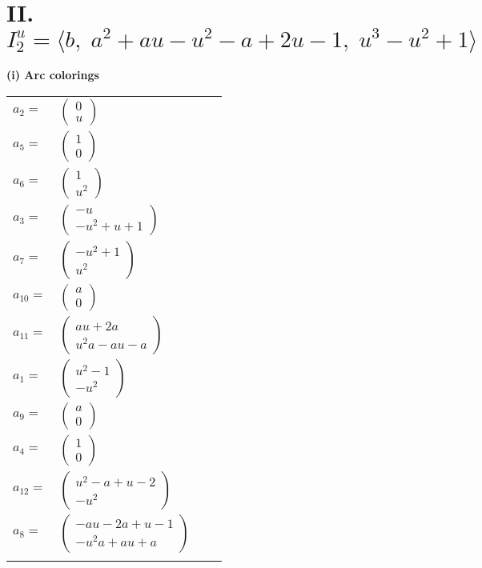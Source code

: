 \documentclass[1p]{elsarticle_modified}
\theoremstyle{definition}
\begin{document}
\centering \section*{II. $I^u_{2}= \langle b,\;a^2+a u- u^2- a+2 u-1,\;u^3- u^2+1 \rangle$}
\flushleft \textbf{(i) Arc colorings}\\
\begin{tabular}{m{7pt} m{180pt} m{7pt} m{180pt} }
\flushright $a_{2}=$&$\begin{pmatrix}0\\u\end{pmatrix}$ \\
\flushright $a_{5}=$&$\begin{pmatrix}1\\0\end{pmatrix}$ \\
\flushright $a_{6}=$&$\begin{pmatrix}1\\u^2\end{pmatrix}$ \\
\flushright $a_{3}=$&$\begin{pmatrix}- u\\- u^2+u+1\end{pmatrix}$ \\
\flushright $a_{7}=$&$\begin{pmatrix}- u^2+1\\u^2\end{pmatrix}$ \\
\flushright $a_{10}=$&$\begin{pmatrix}a\\0\end{pmatrix}$ \\
\flushright $a_{11}=$&$\begin{pmatrix}a u+2 a\\u^2 a- a u- a\end{pmatrix}$ \\
\flushright $a_{1}=$&$\begin{pmatrix}u^2-1\\- u^2\end{pmatrix}$ \\
\flushright $a_{9}=$&$\begin{pmatrix}a\\0\end{pmatrix}$ \\
\flushright $a_{4}=$&$\begin{pmatrix}1\\0\end{pmatrix}$ \\
\flushright $a_{12}=$&$\begin{pmatrix}u^2- a+u-2\\- u^2\end{pmatrix}$ \\
\flushright $a_{8}=$&$\begin{pmatrix}- a u-2 a+u-1\\- u^2 a+a u+a\end{pmatrix}$\\&\end{tabular}
\end{document}
